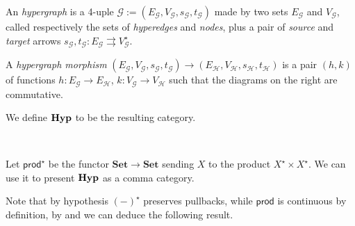 \documentclass[a4paper,UKenglish,cleveref,pdftex,thm-restate,numberwithinsect]{lipics-v2021}
\newcommand{\Set}{\mathbf{Set}}
\def\E{\textbf {\textup{E}}}
\newcommand{\catname}[1]{\textbf{\textup{#1}}}
\newcommand{\hyp}{\catname{Hyp}}
\newcommand{\pro}{\mathsf{prod}}
\newcommand{\comma}[2]{#1\hspace{1pt} {\downarrow}#2}
\newcommand{\id}[1]{\mathsf{id}_{#1}}
\begin{document}
\noindent 
\parbox{10.8cm}{\begin{definition}An \emph{hypergraph} is a 4-uple $\mathcal{G}:=(E_\mathcal{G}, V_\mathcal{G}, s_\mathcal{G}, t_\mathcal{G})$ made by two sets $E_\mathcal{G}$ and $V_\mathcal{G}$, called respectively the sets of \emph{hyperedges} and \emph{nodes}, plus a pair of \emph{source} and \emph{target} arrows  $s_\mathcal{G}, t_\mathcal{G}\colon E_\mathcal{G}\rightrightarrows V_\mathcal{G}^\star$. 
		
\hspace{10pt} A \emph{hypergraph morphism} $(E_\mathcal{G}, V_\mathcal{G}, s_\mathcal{G}, t_\mathcal{G})\to (E_\mathcal{H}, V_\mathcal{H}, s_\mathcal{H}, t_\mathcal{H})$ is a pair $(h,k)$ of functions $h\colon E_\mathcal{G}\to E_\mathcal{H}$, $k\colon V_\mathcal{G}\to V_\mathcal{H}$ such that the diagrams on the right are commutative.

\hspace{10pt}	We define $\hyp$ to be the resulting category.
\end{definition}}\hfill\parbox{3cm}{ \hspace{1pt}\\  }

Let $\pro^\star$ be the functor $\Set\to \Set$ sending $X$ to the product $X^\star\times X^\star$.  We can use it to present $\hyp$ as a comma category.


Note that by hypothesis $(-)^\star$ preserves pullbacks, while $\pro$ is continuous by definition, by  and  we can deduce the following result.


\end{document}
